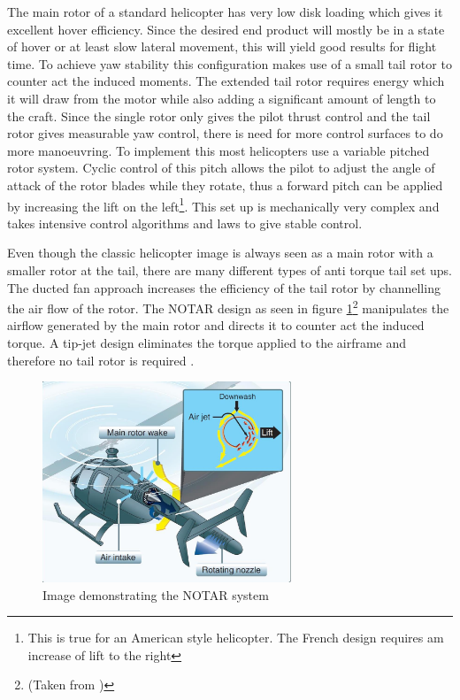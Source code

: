 The main rotor of a standard helicopter has very low disk loading which gives it excellent hover efficiency. Since the desired end product will mostly be in a state of hover or at least slow lateral movement, this will yield good results for flight time. To achieve yaw stability this configuration makes use of a small tail rotor to counter act the induced moments. The extended tail rotor requires energy which it will draw from the motor while also adding a significant amount of length to the craft. Since the single rotor only gives the pilot thrust control and the tail rotor gives measurable yaw control, there is need for more control surfaces to do more manoeuvring. To implement this most helicopters use a variable pitched rotor system. Cyclic control of this pitch allows the pilot to adjust the angle of attack of the rotor blades while they rotate, thus a forward pitch can be applied by increasing the lift on the left\footnote{This is true for an American style helicopter. The French design requires am increase of lift to the right}. This set up is mechanically very complex and takes intensive control algorithms and laws to give stable control.

Even though the classic helicopter image is always seen as a main rotor with a smaller rotor at the tail, there are many different types of anti torque tail set ups. The ducted fan approach increases the efficiency of the tail rotor by channelling the air flow of the rotor. The NOTAR design \cite{US4200252} as seen in figure \ref{IM_NOTAR}\footnote{(Taken from \cite{Heli})} manipulates the airflow generated by the main rotor and directs it to counter act the induced torque. A tip-jet design eliminates the torque applied to the airframe and therefore no tail rotor is required \cite{RotorConfig}. 

\begin{figure}[H]
\centering
\includegraphics[height = 6cm]{Images/Literature/NOTAR}     
\caption{Image demonstrating the NOTAR system \cite{Heli}}
\label{IM_NOTAR}
\end{figure}

